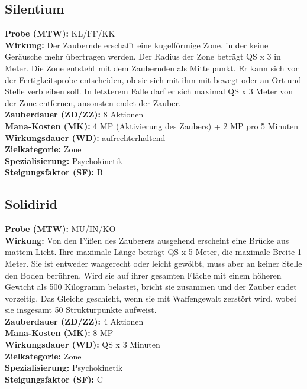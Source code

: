 \subsection{Silentium}
\label{chap:silentium}
\textbf{Probe (MTW):} KL/FF/KK \\
\textbf{Wirkung:} Der Zaubernde erschafft eine kugelförmige Zone, in der keine Geräusche mehr übertragen werden. Der Radius der Zone beträgt QS x 3 in Meter. Die Zone entsteht mit dem Zaubernden als Mittelpunkt. Er kann sich vor der Fertigkeitsprobe entscheiden, ob sie sich mit ihm mit bewegt oder an Ort und Stelle verbleiben soll. In letzterem Falle darf er sich maximal QS x 3 Meter von der Zone entfernen, ansonsten endet der Zauber. \\
\textbf{Zauberdauer (ZD/ZZ):} 8 Aktionen \\
\textbf{Mana-Kosten (MK):} 4 MP (Aktivierung des Zaubers) + 2 MP pro 5 Minuten \\
\textbf{Wirkungsdauer (WD):} aufrechterhaltend \\
\textbf{Zielkategorie:} Zone \\
\textbf{Spezialisierung:} Psychokinetik \\
\textbf{Steigungsfaktor (SF):} B


\subsection{Solidirid}
\label{chap:solidirid}
\textbf{Probe (MTW):} MU/IN/KO \\
\textbf{Wirkung:} Von den Füßen des Zauberers ausgehend erscheint eine Brücke aus mattem Licht. Ihre maximale Länge beträgt QS x 5 Meter, die maximale Breite 1 Meter. Sie ist entweder waagerecht oder leicht gewölbt, muss aber an keiner Stelle den Boden berühren. Wird sie auf ihrer gesamten Fläche mit einem höheren Gewicht als 500 Kilogramm belastet, bricht sie zusammen und der Zauber endet vorzeitig. Das Gleiche geschieht, wenn sie mit Waffengewalt zerstört wird, wobei sie insgesamt 50 Strukturpunkte aufweist.\\
\textbf{Zauberdauer (ZD/ZZ):} 4 Aktionen \\
\textbf{Mana-Kosten (MK):} 8 MP \\
\textbf{Wirkungsdauer (WD):} QS x 3 Minuten \\
\textbf{Zielkategorie:} Zone \\
\textbf{Spezialisierung:} Psychokinetik \\
\textbf{Steigungsfaktor (SF):} C


